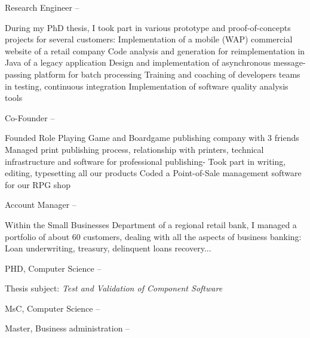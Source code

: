 \documentclass[a4paper,MMMyyyy,nonstopmode]{simpleresumecv}
\begin{document}
\begin{Body}
\Entry
Research Engineer
\hfill
{} --
\begin{Detail}
During my PhD thesis, I took part in various prototype and proof-of-concepts projects for several customers:
\BulletItem Implementation of a mobile (WAP) commercial website of a retail company
\BulletItem Code analysis and generation for reimplementation in Java of a legacy application
\BulletItem Design and implementation of asynchronous message-passing platform for batch processing
\BulletItem Training and coaching of developers teams in testing, continuous integration
\BulletItem Implementation of software quality analysis tools
\end{Detail}

\Entry
Co-Founder
\hfill
{} --
\begin{Detail}
\BulletItem Founded Role Playing Game and Boardgame publishing company with 3 friends
\BulletItem Managed print publishing process, relationship with printers, technical infrastructure and software for professional publishing- Took part in writing, editing, typesetting all our products
\BulletItem Coded a Point-of-Sale management software for our RPG shop
\end{Detail}

\Entry
Account Manager
\hfill
{} --
\begin{Detail}
  Within the Small Businesses Department of a regional retail bank, I managed a portfolio of about 60 customers, dealing with all the aspects of business banking: Loan underwriting, treasury, delinquent loans recovery...
\end{Detail}

\Entry
PHD, Computer Science
\hfill
{} --
\begin{Detail}
  Thesis subject: \emph{Test and Validation of Component Software}
\end{Detail}
\Entry
MsC, Computer Science
\hfill
{} --


\Entry
Master, Business administration
\hfill
{} --


\end{Body}
\end{document}
